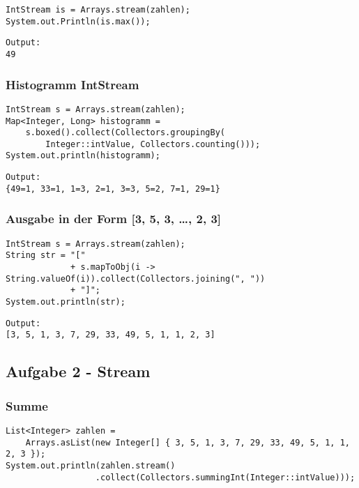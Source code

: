 \begin{verbatim}
IntStream is = Arrays.stream(zahlen);
System.out.Println(is.max());
\end{verbatim}

\begin{verbatim}
Output:
49
\end{verbatim}

\subsubsection{Histogramm IntStream}\label{histogramm-intstream}

\begin{verbatim}
IntStream s = Arrays.stream(zahlen);
Map<Integer, Long> histogramm = 
    s.boxed().collect(Collectors.groupingBy(
        Integer::intValue, Collectors.counting()));
System.out.println(histogramm);
\end{verbatim}

\begin{verbatim}
Output:
{49=1, 33=1, 1=3, 2=1, 3=3, 5=2, 7=1, 29=1}
\end{verbatim}

\subsubsection{Ausgabe in der Form {[}3, 5, 3, \ldots{}, 2,
3{]}}\label{ausgabe-in-der-form-3-5-3-2-3}

\begin{verbatim}
IntStream s = Arrays.stream(zahlen);
String str = "["
             + s.mapToObj(i -> String.valueOf(i)).collect(Collectors.joining(", "))
             + "]";
System.out.println(str);
\end{verbatim}

\begin{verbatim}
Output:
[3, 5, 1, 3, 7, 29, 33, 49, 5, 1, 1, 2, 3]
\end{verbatim}

\subsection{Aufgabe 2 - Stream}\label{aufgabe-2---stream}

\subsubsection{Summe}\label{summe}

\begin{verbatim}
List<Integer> zahlen = 
    Arrays.asList(new Integer[] { 3, 5, 1, 3, 7, 29, 33, 49, 5, 1, 1, 2, 3 });
System.out.println(zahlen.stream()
                  .collect(Collectors.summingInt(Integer::intValue)));
\end{verbatim}

